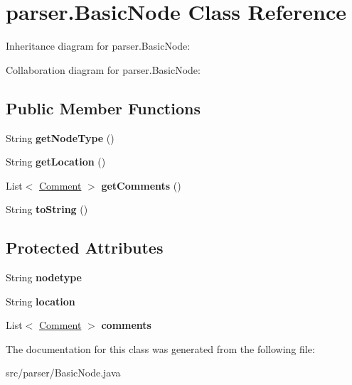 \hypertarget{classparser_1_1_basic_node}{}\section{parser.\+Basic\+Node Class Reference}
\label{classparser_1_1_basic_node}


Inheritance diagram for parser.\+Basic\+Node\+:


Collaboration diagram for parser.\+Basic\+Node\+:
\subsection*{Public Member Functions}
\begin{DoxyCompactItemize}
\item 
String {\bfseries get\+Node\+Type} ()\hypertarget{classparser_1_1_basic_node_a8881edad7244b64a7185acdf55b4f769}{}\label{classparser_1_1_basic_node_a8881edad7244b64a7185acdf55b4f769}

\item 
String {\bfseries get\+Location} ()\hypertarget{classparser_1_1_basic_node_a385f881f6b90972e920db965dc8c0089}{}\label{classparser_1_1_basic_node_a385f881f6b90972e920db965dc8c0089}

\item 
List$<$ \hyperlink{classparser_1_1_comment}{Comment} $>$ {\bfseries get\+Comments} ()\hypertarget{classparser_1_1_basic_node_a67797660b30772631fd9d73418b489a5}{}\label{classparser_1_1_basic_node_a67797660b30772631fd9d73418b489a5}

\item 
String {\bfseries to\+String} ()\hypertarget{classparser_1_1_basic_node_a5ca7905c288cfb4aed0808a5d5adda80}{}\label{classparser_1_1_basic_node_a5ca7905c288cfb4aed0808a5d5adda80}

\end{DoxyCompactItemize}
\subsection*{Protected Attributes}
\begin{DoxyCompactItemize}
\item 
String {\bfseries nodetype}\hypertarget{classparser_1_1_basic_node_a076838237f805311126a9c785b3d176b}{}\label{classparser_1_1_basic_node_a076838237f805311126a9c785b3d176b}

\item 
String {\bfseries location}\hypertarget{classparser_1_1_basic_node_a1679c05bd6e69acdeeaf586ed54d9b03}{}\label{classparser_1_1_basic_node_a1679c05bd6e69acdeeaf586ed54d9b03}

\item 
List$<$ \hyperlink{classparser_1_1_comment}{Comment} $>$ {\bfseries comments}\hypertarget{classparser_1_1_basic_node_ac5d4f47e4dca139b55b3f6858d92b786}{}\label{classparser_1_1_basic_node_ac5d4f47e4dca139b55b3f6858d92b786}

\end{DoxyCompactItemize}


The documentation for this class was generated from the following file\+:\begin{DoxyCompactItemize}
\item 
src/parser/Basic\+Node.\+java\end{DoxyCompactItemize}

